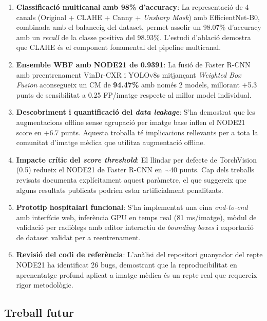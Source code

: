 \documentclass[conference]{IEEEtran}
\begin{document}
\begin{enumerate}
    \item \textbf{Classificació multicanal amb 98\% d'accuracy}: La representació de 4 canals (Original + CLAHE + Canny + \textit{Unsharp Mask}) amb EfficientNet-B0, combinada amb el balanceig del dataset, permet assolir un 98.07\% d'accuracy amb un \textit{recall} de la classe positiva del 98.93\%. L'estudi d'ablació demostra que CLAHE és el component fonamental del pipeline multicanal.

    \item \textbf{Ensemble WBF amb NODE21 de 0.9391}: La fusió de Faster R-CNN amb preentrenament VinDr-CXR i YOLOv8s mitjançant \textit{Weighted Box Fusion} aconsegueix un CM de \textbf{94.47\%} amb només 2 models, millorant +5.3 punts de sensibilitat a 0.25 FP/imatge respecte al millor model individual.

    \item \textbf{Descobriment i quantificació del \textit{data leakage}}: S'ha demostrat que les augmentacions offline sense agrupació per imatge base inflen el NODE21 score en +6.7 punts. Aquesta troballa té implicacions rellevants per a tota la comunitat d'imatge mèdica que utilitza augmentació offline.

    \item \textbf{Impacte crític del \textit{score threshold}}: El llindar per defecte de TorchVision (0.5) redueix el NODE21 de Faster R-CNN en $\sim$40 punts. Cap dels treballs revisats documenta explícitament aquest paràmetre, el que suggereix que alguns resultats publicats podrien estar artificialment penalitzats.

    \item \textbf{Prototip hospitalari funcional}: S'ha implementat una eina \textit{end-to-end} amb interfície web, inferència GPU en temps real (81 ms/imatge), mòdul de validació per radiòlegs amb editor interactiu de \textit{bounding boxes} i exportació de dataset validat per a reentrenament.

    \item \textbf{Revisió del codi de referència}: L'anàlisi del repositori guanyador del repte NODE21 ha identificat 26 bugs, demostrant que la reproducibilitat en aprenentatge profund aplicat a imatge mèdica és un repte real que requereix rigor metodològic.
\end{enumerate}

\subsection{Treball futur}
\end{document}
